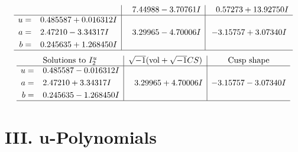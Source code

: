 \documentclass[1p]{elsarticle_modified}
\theoremstyle{definition}
\newcommand{\I}{\sqrt{-1}}
\begin{document}
$$\begin{array}{c|c|c}
 & \phantom{-}7.44988 - 3.70761 I & \phantom{-}0.57273 + 13.92750 I \\ \hline\begin{aligned}
u &= \phantom{-}0.485587 + 0.016312 I \\
a &= \phantom{-}2.47210 - 3.34317 I \\
b &= \phantom{-}0.245635 + 1.268450 I\end{aligned}
 & \phantom{-}3.29965 - 4.70006 I & -3.15757 + 3.07340 I\\
 \hline 
 \end{array}$$\newpage$$\begin{array}{c|c|c}  
\text{Solutions to }I^u_{2}& \I (\text{vol} + \sqrt{-1}CS) & \text{Cusp shape}\\
 \hline 
\begin{aligned}
u &= \phantom{-}0.485587 - 0.016312 I \\
a &= \phantom{-}2.47210 + 3.34317 I \\
b &= \phantom{-}0.245635 - 1.268450 I\end{aligned}
 & \phantom{-}3.29965 + 4.70006 I & -3.15757 - 3.07340 I\\
 \hline 
 \end{array}$$\newpage
\newpage\renewcommand{\arraystretch}{1}
\centering \section*{ III. u-Polynomials}
\end{document}

